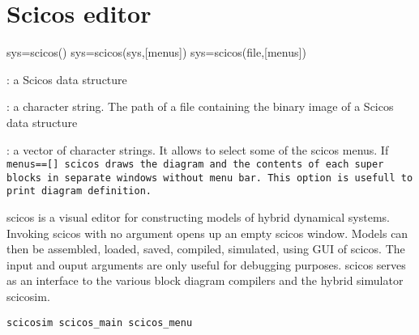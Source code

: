 \section{Scicos editor}



%
%


\label{scicos}

sys=scicos()
sys=scicos(sys,[menus])
sys=scicos(file,[menus])
\begin{scitem}
\item[{\verb?sys?}]
: a Scicos data structure
\item[{\verb?file?}]
: a character string. The path of a file containing the binary image
of a Scicos data structure 
\item[{\verb?menus?}]
: a vector of character strings. It allows to select some of the
scicos menus. If %
\tt menus==[] %
\rm  scicos draws the diagram and the
contents of each super blocks in separate windows without menu
bar. This option is usefull to print diagram definition.

\end{scitem}%
scicos is a visual editor for constructing models of hybrid dynamical
systems. Invoking scicos with no argument opens up an empty scicos
window. Models can then be assembled, loaded, saved, compiled,
simulated, using GUI of scicos. The input and ouput arguments are only
useful for debugging purposes. scicos serves as an interface to the
various block diagram compilers and the hybrid simulator scicosim.

{\verb?scicosim scicos_main scicos_menu ?} \pageref{scicosimscicosmainscicosmenu}
      










